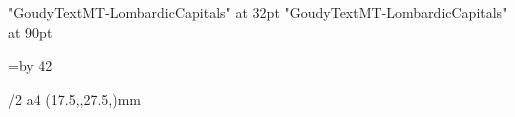 \fontfam[alcuin]

\font\Lombardic "GoudyTextMT-LombardicCapitals" at 32pt\relax
\font\BigLombardic "GoudyTextMT-LombardicCapitals" at 90pt\relax

\typosize[11/14]

\svlang

\vsize=\topskip \advance \vsize by 42\baselineskip

\parskip0pt
\parindent0pt

\margins/2 a4 (17.5,,27.5,)mm

\footline{}

\onlycmyk
\def\Red{\setcmykcolor{0 0.9 0.9 0.15}}
\def\Blue{\setcmykcolor{0.7 0.5 0 0.3}}

\def\kapitel#1#2{%
	\noindent
	{\Red {\setff{letterspace=0}\currvar #1} $\cdot$ #2}%
}

\newif\ifblue \bluetrue

\def\initial#1{%
	\par\null\par
	\ifblue
		\def\initialcolor{\Red}%
		\bluefalse
	\else
		\def\initialcolor{\Blue}%
		\bluetrue
	\fi
	\setbox0\hbox{\initialcolor\Lombardic #1}%
	\dimen0=5pt %
	\dimen1=3pt %
	\if #1D \dimen1=2pt\fi
	\if #1E \dimen0=3pt\fi
	\if #1G \dimen0=3pt\fi
	\if #1I \dimen0=6pt\fi
	\if #1J \dimen0=8pt\fi
	\if #1K \dimen0=6pt\fi
	\if #1M \dimen0=8pt\fi
	\if #1N \dimen0=6pt\fi
	\if #1O \dimen0=3pt \dimen1=2pt\fi
	\if #1P \dimen0=3.5pt\fi
	\if #1Q \dimen0=3pt\fi
	\if #1R \dimen0=6pt\fi
	\if #1U \dimen0=4pt\fi
	\if #1V \dimen0=7pt\fi
	\if #1W \dimen0=3pt\fi
	\if #1X \dimen0=3pt\fi
	\if #1Y \dimen0=7pt\fi
	\if #1Z \dimen0=2pt\fi
	\if #1Ö \dimen0=3pt\fi
	\dimen2=\dimexpr(\wd0-\dimen0+\dimen1)\relax %
	\dimen3=\dimexpr(\hsize-\dimen2)\relax %
	\ht0=0pt \dp0=0pt%
	\moveleft \dimen0 \box0
	\nobreak
	\vskip-2\baselineskip
	\parshape 3 \dimen2 \dimen3 \dimen2 \dimen3 0pt \hsize
	\noindent
}


